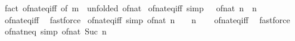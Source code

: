 \begin{isabellebody}
\isamarkupfalse%
\ {\isacharparenleft}{\kern0pt}fact\ of{\isacharunderscore}{\kern0pt}nat{\isacharunderscore}{\kern0pt}eq{\isacharunderscore}{\kern0pt}iff\ {\isacharbrackleft}{\kern0pt}of\ m\ {}{\isacharcomma}{\kern0pt}\ unfolded\ of{\isacharunderscore}{\kern0pt}nat{\isacharunderscore}{\kern0pt}{}{\isacharbrackright}{\kern0pt}{\isacharparenright}{\kern0pt}%
\endisatagproof
{\isafoldproof}%
%
\isadelimproof
\isanewline
%
\endisadelimproof
\isanewline
{}\isamarkupfalse%
\ of{\isacharunderscore}{\kern0pt}nat{\isacharunderscore}{\kern0pt}{}{\isacharunderscore}{\kern0pt}eq{\isacharunderscore}{\kern0pt}iff\ {\isacharbrackleft}{\kern0pt}simp{\isacharbrackright}{\kern0pt}{\isacharcolon}{\kern0pt}\ {\isachardoublequoteopen}{}\ {\isacharequal}{\kern0pt}\ of{\isacharunderscore}{\kern0pt}nat\ n\ {\isasymlongleftrightarrow}\ n{\isacharequal}{\kern0pt}{}{\isachardoublequoteclose}\isanewline
%
\isadelimproof
\ \ %
\endisadelimproof
%
\isatagproof
{}\isamarkupfalse%
\ of{\isacharunderscore}{\kern0pt}nat{\isacharunderscore}{\kern0pt}eq{\isacharunderscore}{\kern0pt}iff\ \isamarkupfalse%
\ fastforce%
\endisatagproof
{\isafoldproof}%
%
\isadelimproof
\isanewline
%
\endisadelimproof
\isanewline
{}\isamarkupfalse%
\ of{\isacharunderscore}{\kern0pt}nat{\isacharunderscore}{\kern0pt}eq{\isacharunderscore}{\kern0pt}{}{\isacharunderscore}{\kern0pt}iff\ {\isacharbrackleft}{\kern0pt}simp{\isacharbrackright}{\kern0pt}{\isacharcolon}{\kern0pt}\ {\isachardoublequoteopen}of{\isacharunderscore}{\kern0pt}nat\ n\ {\isacharequal}{\kern0pt}\ {}\ {\isasymlongleftrightarrow}\ n{\isacharequal}{\kern0pt}{}{\isachardoublequoteclose}\isanewline
%
\isadelimproof
\ \ %
\endisadelimproof
%
\isatagproof
{}\isamarkupfalse%
\ of{\isacharunderscore}{\kern0pt}nat{\isacharunderscore}{\kern0pt}eq{\isacharunderscore}{\kern0pt}iff\ \isamarkupfalse%
\ fastforce%
\endisatagproof
{\isafoldproof}%
%
\isadelimproof
\isanewline
%
\endisadelimproof
\isanewline
{}\isamarkupfalse%
\ of{\isacharunderscore}{\kern0pt}nat{\isacharunderscore}{\kern0pt}neq{\isacharunderscore}{\kern0pt}{}\ {\isacharbrackleft}{\kern0pt}simp{\isacharbrackright}{\kern0pt}{\isacharcolon}{\kern0pt}\ {\isachardoublequoteopen}of{\isacharunderscore}{\kern0pt}nat\ {\isacharparenleft}{\kern0pt}Suc\ n{\isacharparenright}{\kern0pt}\ {\isasymnoteq}\ {}{\isachardoublequoteclose}\isanewline
%
\isadelimproof
\ \ %
\endisadelimproof

\end{isabellebody}
